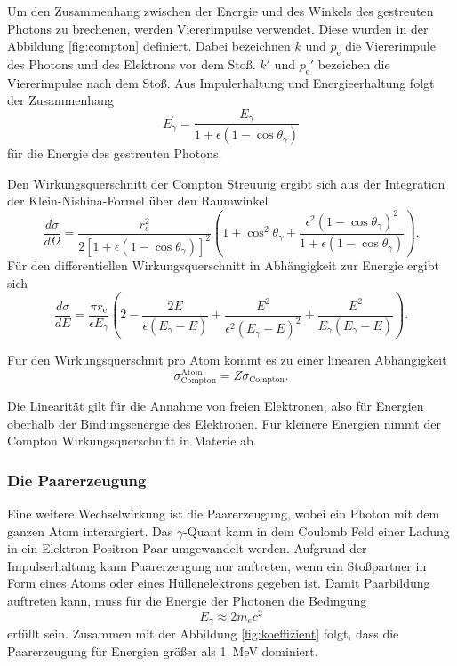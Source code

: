 Um den Zusammenhang zwischen der Energie und des Winkels des gestreuten Photons
zu brechenen, werden Viererimpulse verwendet. Diese wurden in der Abbildung \ref{fig:compton} definiert.
Dabei bezeichnen $k$ und $p_{\text{e}}$ die Viererimpule des Photons und des Elektrons vor dem Stoß.
$k'$ und $p_{\text{e}}'$ bezeichen die Viererimpulse nach dem Stoß.
Aus Impulerhaltung und Energieerhaltung folgt der Zusammenhang
\begin{equation}
    E_\gamma^{\prime}=\frac{E_\gamma}{1+\epsilon\left(1-\cos \theta_\gamma\right)}
    \label{eqn:Energie_comptonstreuung}
\end{equation}
für die Energie des gestreuten Photons.

Den Wirkungsquerschnitt der Compton Streuung ergibt sich aus der Integration der Klein-Nishina-Formel über den Raumwinkel
\begin{equation}
    \frac{d \sigma}{d \Omega}=\frac{r_e^2}{2\left[1+\epsilon\left(1-\cos \theta_\gamma\right)\right]^2}\left(1+\cos ^2 \theta_\gamma+\frac{\epsilon^2\left(1-\cos \theta_\gamma\right)^2}{1+\epsilon\left(1-\cos \theta_\gamma\right)}\right).
\end{equation}
Für den differentiellen Wirkungsquerschnitt in Abhängigkeit zur Energie ergibt sich 
\begin{equation}
    \frac{d \sigma}{d E} = \frac{\pi r_{\text{e}}}{\epsilon E_\gamma} \left(2 - \frac{2 E}{\epsilon \left(E_\gamma - E \right)}+ \frac{E^2}{\epsilon^2 \left(E_\gamma - E \right)^2} + \frac{E^2}{E_\gamma \left(E_\gamma - E \right)}\right).
\end{equation}

Für den Wirkungsquerschnit pro Atom kommt es zu einer linearen Abhängigkeit
\begin{equation}
    \sigma_{\text{Compton}}^{\text{Atom}}=Z \sigma_{\text{Compton}}.
\end{equation}

Die Linearität gilt für die Annahme von freien Elektronen, also für Energien oberhalb der
Bindungsenergie des Elektronen.
Für kleinere Energien nimmt der Compton Wirkungsquerschnitt in Materie ab.

\subsubsection{Die Paarerzeugung}
\label{paarerzeugung}

Eine weitere Wechselwirkung ist die Paarerzeugung, wobei ein Photon mit dem ganzen Atom interargiert.
Das $\gamma$-Quant kann in dem Coulomb Feld einer Ladung in ein Elektron-Positron-Paar umgewandelt werden.
Aufgrund der Impulserhaltung kann Paarerzeugung nur auftreten, wenn ein Stoßpartner in Form eines Atoms oder eines Hüllenelektrons
gegeben ist.
Damit Paarbildung auftreten kann, muss für die Energie der Photonen die Bedingung 
\begin{equation}
    E_\gamma \approx 2 m_e c^2
\end{equation}
erfüllt sein. 
Zusammen mit der Abbildung \ref{fig:koeffizient} folgt, dass die Paarerzeugung für Energien größer als \qty{1}{\mega\eV} dominiert.

